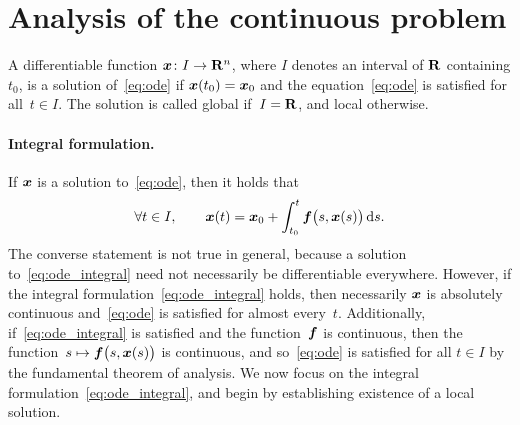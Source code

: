 \section{Analysis of the continuous problem}
A differentiable function $\mathbf{\boldsymbol{x}}\colon I \to \mathbf R^n$,
where $I$ denotes an interval of $\mathbf R$ containing $t_0$,
is a solution of~\eqref{eq:ode} if $\mathbf{\boldsymbol{x}}(t_0) = \mathbf{\boldsymbol{x}}_0$ and the equation~\eqref{eq:ode} is satisfied for all~$t \in I$.
The solution is called global if~$I = \mathbf R$,
and local otherwise.

\paragraph{Integral formulation.}
If $\mathbf{\boldsymbol{x}}$ is a solution to~\eqref{eq:ode},
then it holds that
\begin{equation}
    \label{eq:ode_integral}
    \forall  t \in I, \qquad
    \mathbf{\boldsymbol{x}}(t) = \mathbf{\boldsymbol{x}}_0 + \int_{t_0}^{t} \mathbf{\boldsymbol{f}}\bigl(s, \mathbf{\boldsymbol{x}}(s)\bigr) \, \mathrm d s.
\end{equation}
The converse statement is not true in general,
because a solution to~\eqref{eq:ode_integral} need not necessarily be differentiable everywhere.
However, if the integral formulation~\eqref{eq:ode_integral} holds,
then necessarily $\mathbf{\boldsymbol{x}}$ is absolutely continuous
and~\eqref{eq:ode} is satisfied for almost every~$t$.
Additionally, if~\eqref{eq:ode_integral} is satisfied and the function~$\mathbf{\boldsymbol{f}}$ is continuous,
then the function~$s \mapsto \mathbf{\boldsymbol{f}}\bigl(s, \mathbf{\boldsymbol{x}}(s)\bigr)$ is continuous,
and so~\eqref{eq:ode} is satisfied for all $t \in I$ by the fundamental theorem of analysis.
We now focus on the integral formulation~\eqref{eq:ode_integral},
and begin by establishing existence of a local solution.

